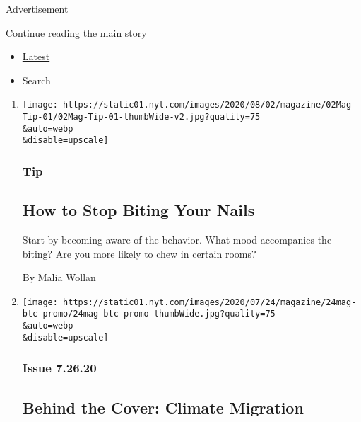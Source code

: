 Advertisement

\protect\hyperlink{after-mid1}{Continue reading the main story}

\begin{itemize}
\tightlist
\item
  \protect\hyperlink{stream-panel}{Latest}
\item
  Search
\end{itemize}

\begin{enumerate}
\def\labelenumi{\arabic{enumi}.}
\item
  \href{/2020/07/28/magazine/how-to-stop-biting-your-nails.html}{}

  \texttt{[image: https://static01.nyt.com/images/2020/08/02/magazine/02Mag-Tip-01/02Mag-Tip-01-thumbWide-v2.jpg?quality=75\\\&auto=webp\\\&disable=upscale]}

  \hypertarget{tip-}{%
  \subsubsection{Tip }\label{tip-}}

  \hypertarget{how-to-stop-biting-your-nails}{%
  \subsection{How to Stop Biting Your
  Nails}\label{how-to-stop-biting-your-nails}}

  Start by becoming aware of the behavior. What mood accompanies the
  biting? Are you more likely to chew in certain rooms?

  By Malia Wollan
\item
  \href{/2020/07/24/magazine/behind-the-cover-climate-migration.html}{}

  \texttt{[image: https://static01.nyt.com/images/2020/07/24/magazine/24mag-btc-promo/24mag-btc-promo-thumbWide.jpg?quality=75\\\&auto=webp\\\&disable=upscale]}

  \hypertarget{issue-72620}{%
  \subsubsection{Issue 7.26.20}\label{issue-72620}}

  \hypertarget{behind-the-cover-climate-migration}{%
  \subsection{Behind the Cover: Climate
  Migration}\label{behind-the-cover-climate-migration}}


\end{enumerate}
